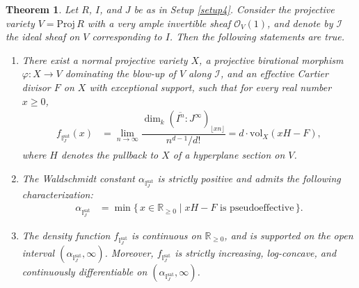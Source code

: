 \documentclass[12pt,a4paper]{amsart}
\theoremstyle{plain}
\newtheorem{theorem}{Theorem}[section]
\theoremstyle{definition}
\numberwithin{equation}{theorem}
\begin{document}
\begin{theorem}\label{symb_geom}
Let $R$, $I$, and $J$ be as in Setup \ref{setup4}. Consider the projective variety $V = \mathrm{Proj}\, R$ with a very ample invertible sheaf $\mathcal{O}_V(1)$, and denote by $\mathcal{I}$ the ideal sheaf on $V$ corresponding to $I$. Then the following statements are true.
\begin{enumerate}[$(i)$]
 \item There exist a normal projective variety $X$, a projective birational morphism $\varphi\colon X \longrightarrow V$ dominating the blow-up of $V$ along $\mathcal{I}$, and an effective Cartier divisor $F$ on $X$ with exceptional support, such that for every real number $x\geq 0$,
 \begin{align*}
 f_{\mathbb{I}^{\mathrm{sat}}_J}(x) & = \lim_{n\to\infty}\dfrac{\dim_k {\left(\overline{I^n} \colon J^{\infty}\right)}_{\lfloor xn \rfloor}}{n^{d-1}/d!} = d\cdot\mathrm{vol}_X(xH-F),
\end{align*}
where $H$ denotes the pullback to $X$ of a hyperplane section on $V$.
\item The Waldschmidt constant $\alpha_{\mathbb{I}^{\mathrm{sat}}_J}$ is strictly positive and admits the following characterization:
 \begin{align*}
   \alpha_{\mathbb{I}^{\mathrm{sat}}_J}
      &= \min \{\, x \in \mathbb{R}_{\geq 0} \mid xH - F \text{ is pseudoeffective} \,\}.
 \end{align*}
 \item The density function $f_{\mathbb{I}^{\mathrm{sat}}_J}$ is continuous on $\mathbb{R}_{\geq 0}$, and is supported on the open interval $(\alpha_{\mathbb{I}^{\mathrm{sat}}_J}, \infty)$. Moreover, $f_{\mathbb{I}^{\mathrm{sat}}_J}$ is strictly increasing, log-concave, and continuously differentiable on $(\alpha_{\mathbb{I}^{\mathrm{sat}}_J}, \infty)$.
\end{enumerate}
\end{theorem}
\end{document}
